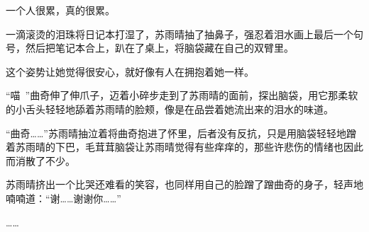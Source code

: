 一个人很累，真的很累。

一滴滚烫的泪珠将日记本打湿了，苏雨晴抽了抽鼻子，强忍着泪水画上最后一个句号，然后把笔记本合上，趴在了桌上，将脑袋藏在自己的双臂里。

这个姿势让她觉得很安心，就好像有人在拥抱着她一样。

“喵~”曲奇伸了伸爪子，迈着小碎步走到了苏雨晴的面前，探出脑袋，用它那柔软的小舌头轻轻地舔着苏雨晴的脸颊，像是在品尝着她流出来的泪水的味道。

“曲奇……”苏雨晴抽泣着将曲奇抱进了怀里，后者没有反抗，只是用脑袋轻轻地蹭着苏雨晴的下巴，毛茸茸脑袋让苏雨晴觉得有些痒痒的，那些许悲伤的情绪也因此而消散了不少。

苏雨晴挤出一个比哭还难看的笑容，也同样用自己的脸蹭了蹭曲奇的身子，轻声地喃喃道：“谢……谢谢你……”

……
